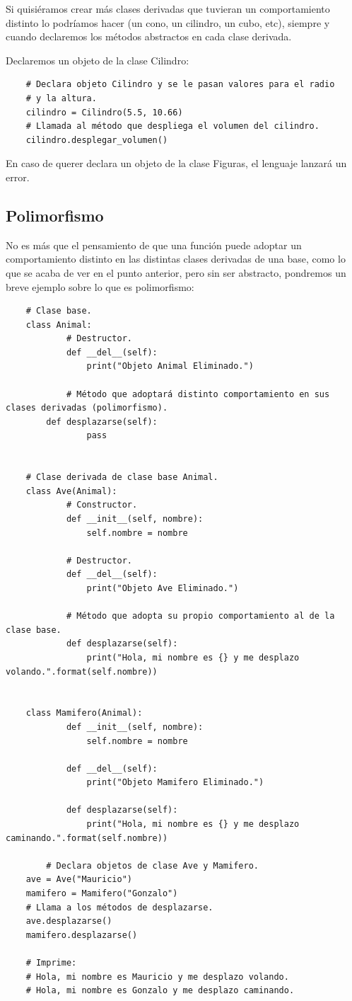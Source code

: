 Si quisiéramos crear más clases derivadas que tuvieran un comportamiento distinto lo podríamos hacer (un cono, un cilindro, un cubo, etc), siempre y cuando declaremos los métodos abstractos en cada clase derivada.

Declaremos un objeto de la clase Cilindro:
\begin{lstlisting}
	# Declara objeto Cilindro y se le pasan valores para el radio
	# y la altura.
	cilindro = Cilindro(5.5, 10.66)
	# Llamada al método que despliega el volumen del cilindro.
	cilindro.desplegar_volumen()
\end{lstlisting}

En caso de querer declara un objeto de la clase Figuras, el lenguaje lanzará un error.


\subsection{Polimorfismo}

No es más que el pensamiento de que una función puede adoptar un comportamiento distinto en las distintas clases derivadas de una base, como lo que se acaba de ver en el punto anterior, pero sin ser abstracto, pondremos un breve ejemplo sobre lo que es polimorfismo:
\begin{lstlisting}
	# Clase base.
	class Animal:
    		# Destructor.
    		def __del__(self):
        		print("Objeto Animal Eliminado.")

    		# Método que adoptará distinto comportamiento en sus clases derivadas (polimorfismo).
   		def desplazarse(self):
        		pass


	# Clase derivada de clase base Animal.
	class Ave(Animal):
    		# Constructor.
    		def __init__(self, nombre):
        		self.nombre = nombre

    		# Destructor.
    		def __del__(self):
        		print("Objeto Ave Eliminado.")

    		# Método que adopta su propio comportamiento al de la clase base.
    		def desplazarse(self):
        		print("Hola, mi nombre es {} y me desplazo volando.".format(self.nombre))


	class Mamifero(Animal):
    		def __init__(self, nombre):
        		self.nombre = nombre

    		def __del__(self):
        		print("Objeto Mamifero Eliminado.")

    		def desplazarse(self):
        		print("Hola, mi nombre es {} y me desplazo caminando.".format(self.nombre))
    
    	# Declara objetos de clase Ave y Mamifero.
	ave = Ave("Mauricio")
	mamifero = Mamifero("Gonzalo")
	# Llama a los métodos de desplazarse.
	ave.desplazarse()
	mamifero.desplazarse()
	
	# Imprime:
	# Hola, mi nombre es Mauricio y me desplazo volando.
	# Hola, mi nombre es Gonzalo y me desplazo caminando.
\end{lstlisting}

